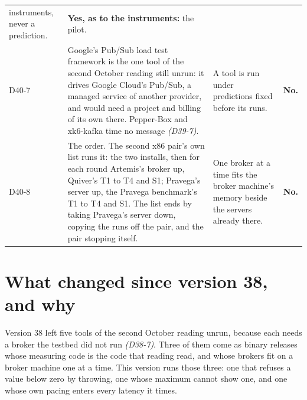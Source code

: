 \documentclass[11pt]{article}
\newcommand{\gl}[1]{{\color{soft}\itshape\small (#1)}}
\begin{document}
{\begin{longtable}{@{}p{1.1cm} >{\raggedright\arraybackslash}p{6.1cm} >{\raggedright\arraybackslash}p{6.0cm} >{\raggedright\arraybackslash}p{2.2cm}@{}}
instruments, never a prediction. & \textbf{Yes, as to the instruments:} the pilot. \\
D40-7 & Google's Pub/Sub load test framework is the one tool of the second October reading still unrun: it drives Google Cloud's Pub/Sub, a managed service of another provider, and would need a project and billing of its own there. Pepper-Box and xk6-kafka time no message \gl{D39-7}. & A tool is run under predictions fixed before its runs. & \textbf{No.} \\
D40-8 & The order. The second x86 pair's own list runs it: the two installs, then for each round Artemis's broker up, Quiver's T1 to T4 and S1; Pravega's server up, the Pravega benchmark's T1 to T4 and S1. The list ends by taking Pravega's server down, copying the runs off the pair, and the pair stopping itself. & One broker at a time fits the broker machine's memory beside the servers already there. & \textbf{No.} \\
\bottomrule
\end{longtable}}

\section*{What changed since version 38, and why}
Version 38 left five tools of the second October reading unrun, because each needs a broker the
testbed did not run \gl{D38-7}. Three of them come as binary releases whose measuring code is the
code that reading read, and whose brokers fit on a broker machine one at a time. This version runs
those three: one that refuses a value below zero by throwing, one whose maximum cannot show one,
and one whose own pacing enters every latency it times.
\end{document}
